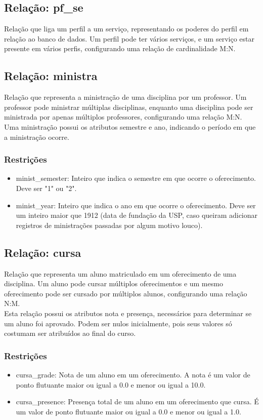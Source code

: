 \documentclass{article}
\begin{document}
  	\subsection{Relação: pf\_se}
  	    \quad Relação que liga um perfil a um serviço, representando os poderes do perfil em relação ao banco de dados. Um perfil pode ter vários serviços, e um serviço estar presente em vários perfis, configurando uma relação de cardinalidade M:N.
  	
  	\subsection{Relação: ministra}
  	    \quad Relação que representa a ministração de uma disciplina por um professor. Um professor pode ministrar múltiplas disciplinas, enquanto uma disciplina pode ser ministrada por apenas múltiplos professores, configurando uma relação M:N. \\
  	    \quad Uma ministração possui os atributos semestre e ano, indicando o período em que a ministração ocorre.
  	    \subsubsection{Restrições}
  	        \begin{itemize}
  	            \item minist\_semester: Inteiro que indica o semestre em que ocorre o oferecimento. Deve ser "1" ou "2".
  	            \item minist\_year: Inteiro que indica o ano em que ocorre o oferecimento. Deve ser um inteiro maior que 1912 (data de fundação da USP, caso queiram adicionar registros de ministrações passadas por algum motivo louco).
  	        \end{itemize}
  	     
  	\subsection{Relação: cursa}
  	    \quad Relação que representa um aluno matriculado em um oferecimento de uma disciplina. Um aluno pode cursar múltiplos oferecimentos e um mesmo oferecimento pode ser cursado por múltiplos alunos, configurando uma relação N:M. \\
  	    \quad Esta relação possui os atributos nota e presença, necessários para determinar se um aluno foi aprovado. Podem ser nulos inicialmente, pois seus valores só costumam ser atribuídos ao final do curso.
  	    \subsubsection{Restrições}
  	        \begin{itemize}
  	            \item cursa\_grade: Nota de um aluno em um oferecimento. A nota é um valor de ponto flutuante maior ou igual a 0.0 e menor ou igual a 10.0.
  	            \item cursa\_presence: Presença total de um aluno em um oferecimento que cursa. É um valor de ponto flutuante maior ou igual a 0.0 e menor ou igual a 1.0.
  	         \end{itemize}
\end{document}
